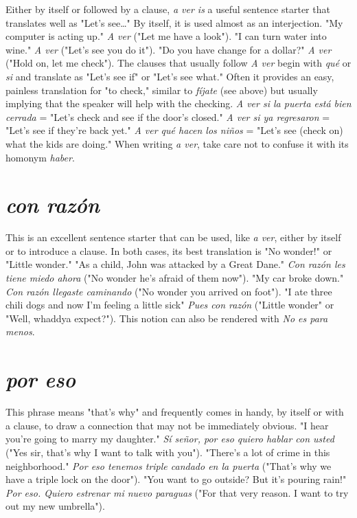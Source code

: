 Either by itself or followed by a clause, \emph{a ver is} a useful sentence starter that translates well as "Let's see\ldots{}" By itself, it is used
almost as an interjection. "My computer is acting up." \emph{A ver} ("Let
me have a look"). "I can turn water into wine." \emph{A ver} ("Let's see you
do it"). "Do you have change for a dollar?" \emph{A ver} ("Hold on, let me
check"). The clauses that usually follow \emph{A ver} begin with \emph{qué} or \emph{si}
and translate as "Let's see if" or "Let's see what." Often it provides an
easy, painless translation for "to check," similar to \emph{fíjate} (see above)
but usually implying that the speaker will help with the checking. \emph{A
ver si la puerta está bien cerrada} = "Let's check and see if the door's
closed." \emph{A ver si ya regresaron} = "Let's see if they're back yet." \emph{A
ver qué hacen los niños} = "Let's see (check on) what the kids are doing." When writing \emph{a ver}, take care not to confuse it with its homonym
\emph{haber}.

\section{\emph{con razón}}

This is an excellent sentence starter that can be used, like
\emph{a ver}, either by itself or to introduce a clause. In both cases, its best
translation is "No wonder!" or "Little wonder." "As a child, John was
attacked by a Great Dane." \emph{Con razón les tiene miedo ahora} ("No
wonder he's afraid of them now"). "My car broke down." \emph{Con razón
llegaste caminando} ("No wonder you arrived on foot"). "I ate three
chili dogs and now I'm feeling a little sick" \emph{Pues con razón} ("Little
wonder" or "Well, whaddya expect?"). This notion can also be rendered
with \emph{No es para menos}.

\section{\emph{por eso}}

This phrase means "that's why" and frequently comes in
handy, by itself or with a clause, to draw a connection that may not be
immediately obvious. "I hear you're going to marry my daughter." \emph{Sí
señor, por eso quiero hablar con usted} ("Yes sir, that's why I want to
talk with you"). "There's a lot of crime in this neighborhood." \emph{Por eso
tenemos triple candado en la puerta} ("That's why we have a triple
lock on the door"). "You want to go outside? But it's pouring rain!" \emph{Por
eso. Quiero estrenar mi nuevo paraguas} ("For that very reason. I want
to try out my new umbrella").

